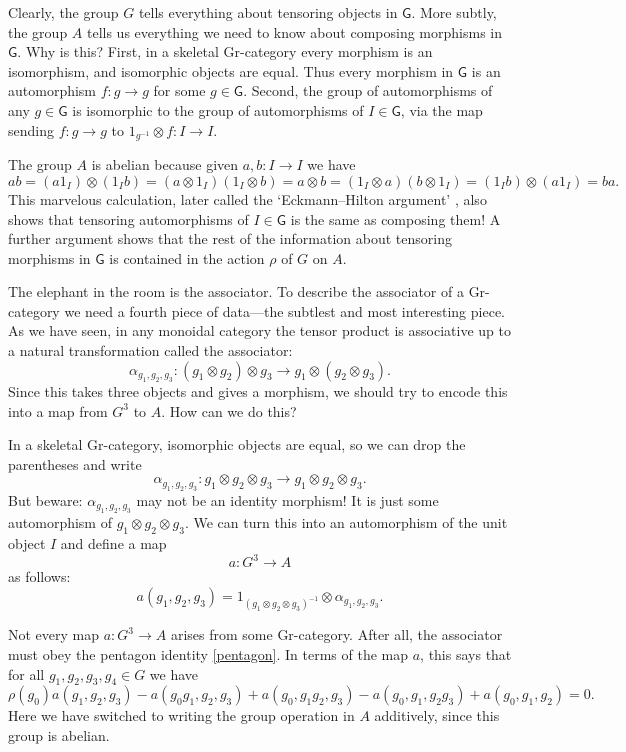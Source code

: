 \documentclass[reqno,12pt]{amsart}
\newcommand{\maps}{\colon}    %
\newcommand{\G}{{\mathsf{G}}}   %
\theoremstyle{definition}
\newcommand{\be}{\begin{equation}}
\newcommand{\ee}{\end{equation}}
\begin{document}
Clearly, the group $G$ tells everything about tensoring objects in $\G$.  More subtly, the group $A$ tells us everything we need to know about composing morphisms in $\G$.  Why is this?  First, in a skeletal Gr-category every morphism is an isomorphism, and isomorphic objects are equal.  Thus every morphism in $\G$ is an automorphism $f \maps g \to g$ for some $g \in \G$.   Second, the group of automorphisms of any $g \in \G$ is 
isomorphic to the group of automorphisms of $I \in \G$, via the map sending $f \maps g \to g$ to $1_{g^{-1}} \otimes f \maps I \to I$.  

The group $A$ is abelian because given $a, b \maps I \to I$ we have
\[   ab =  (a 1_I) \otimes (1_I b) = (a \otimes 1_I)(1_I \otimes b) = a \otimes b = (1_I \otimes a)(b \otimes 1_I) = (1_I b) \otimes (a 1_I) = ba   .\]
This marvelous calculation, later called the `Eckmann--Hilton argument' \cite{EH62},
also shows that tensoring automorphisms of $I \in \G$ is the same as composing them!  A further argument shows that the rest of the information about tensoring morphisms in $\G$ is contained in the action $\rho$ of $G$ on $A$.

The elephant in the room is the associator.  To describe the associator of a Gr-category
we need a fourth piece of data---the subtlest and most interesting piece.   As we have seen, in any monoidal category the tensor product is associative up to a natural transformation called the associator:
\[    \alpha_{g_1, g_2, g_3} \maps (g_1 \otimes g_2) \otimes g_3 \to g_1 \otimes (g_2 \otimes g_3).  \]
Since this takes three objects and gives a morphism, we should try to encode this into a
map from $G^3$ to $A$.  How can we do this?

In a skeletal Gr-category, isomorphic objects are equal, so we can drop the parentheses and write
\[    \alpha_{g_1, g_2, g_3} \maps g_1 \otimes g_2 \otimes g_3 \to g_1 \otimes g_2 \otimes g_3 .\]
But beware: $\alpha_{g_1,g_2,g_3}$ may not be an identity morphism!  It is just some automorphism of $ g_1 \otimes g_2 \otimes g_3$.  We can turn this into an automorphism of the unit object $I$ and define a map
\[  a \maps G^3 \to A \]
as follows:
\[    a(g_1, g_2, g_3) = 1_{(g_1 \otimes g_2 \otimes g_3)^{-1}} \otimes \alpha_{g_1, g_2, g_3} .\]

Not every map $a \maps G^3 \to A$ arises from some Gr-category.  After all, the associator must obey the pentagon identity \eqref{pentagon}.   In terms of the map $a$, this says that for all $g_1, g_2, g_3, g_4 \in G$ we have
\be
  \rho(g_0)a(g_1,g_2,g_3) - a(g_0g_1, g_2, g_3) +  
  a(g_0, g_1g_2, g_3) - a(g_0, g_1, g_2g_3) +
  a(g_0, g_1, g_2) = 0.
\label{3-cocycle}
\ee
Here we have switched to writing the group operation in $A$ additively, since this group is abelian.
\end{document}
